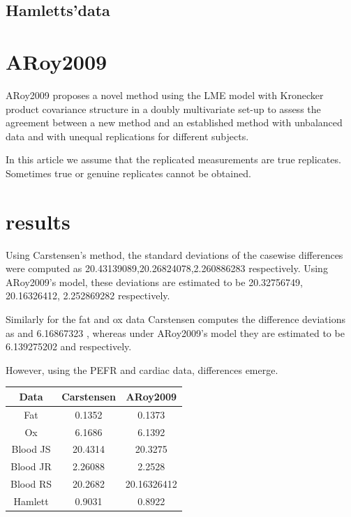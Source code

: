\documentclass[12pt, a4paper]{report}
\theoremstyle{plain}
\theoremstyle{definition}
\theoremstyle{remark}
\begin{document}
	\subsection{Hamletts'data}
	
	\section{ARoy2009}
	ARoy2009 proposes a novel method using the LME model with Kronecker product covariance structure in a doubly multivariate set-up to assess the agreement between a new method and an established
	method with unbalanced data and with unequal replications for different subjects.
	
	In this article we assume that the replicated measurements are true replicates. Sometimes true or genuine replicates cannot be obtained.
	
	\section{results}
	
	Using Carstensen's method, the standard deviations of the casewise
	differences were computed as 20.43139089,20.26824078,2.260886283
	respectively. Using ARoy2009's model, these deviations are estimated to
	be 20.32756749, 20.16326412, 2.252869282 respectively.
	
	Similarly for the fat and ox data Carstensen computes the
	difference deviations as and 6.16867323 , whereas under
	ARoy2009's model they are estimated to be 6.139275202 and
	respectively.
	
	However, using the PEFR and cardiac data, differences emerge.
	
	\begin{tabular}{|c|c|c|}
		\hline
		Data & Carstensen & ARoy2009 \\
		\hline
		Fat &  0.1352 & 0.1373\\
		Ox & 6.1686 & 6.1392 \\
		Blood JS & 20.4314 & 20.3275
		\\
		Blood JR & 2.26088 & 2.2528
		\\
		Blood RS & 20.2682 & 20.16326412
		\\
		Hamlett & 0.9031 & 0.8922
		
		\\
		\hline
	\end{tabular}
	
\end{document}
